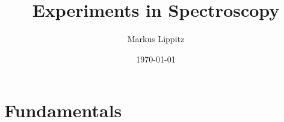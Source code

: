 \documentclass[notoc,nofonts,a4paper,oneside,nobib]{tufte-book}
\begin{document}
\title{Experiments in Spectroscopy}

\author{Markus Lippitz}
\date{\today}


\maketitle



\tableofcontents

\part{Fundamentals}





%

%
%
%
%
%
%
%
%
%
%
%
%
%
%
%
%
%
%
%
%
%
%
%
%
%
%



\printbibliography
\end{document}
